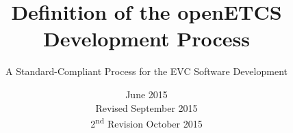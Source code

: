 \documentclass{template/openetcs_article}
\begin{document}
\frontmatter
{}



\newcommand{\nl}{\mbox{}\\}

\newcommand{\nthng}[1]{}

\newcommand{\oldtext}[1]{\textbf{OLD:} {\em #1} \textbf{DLO}}

\newcommand{\cmmnt}[1]{\fbox{#1}}

\newcommand{\bgcmmnt}[1]{\nl\framebox{\parbox{.95\textwidth}{#1}}\nl[2mm]}

\newcommand{\qq}[1]{?`#1?}

\newcommand{\tbd}{\cmmnt{tbd}}






\title{Definition of the openETCS Development Process}

\subtitle{A Standard-Compliant Process for the EVC Software Development}

\date{June 2015\\
Revised September 2015\\
2\textsuperscript{nd} Revision October 2015}


\end{document}
